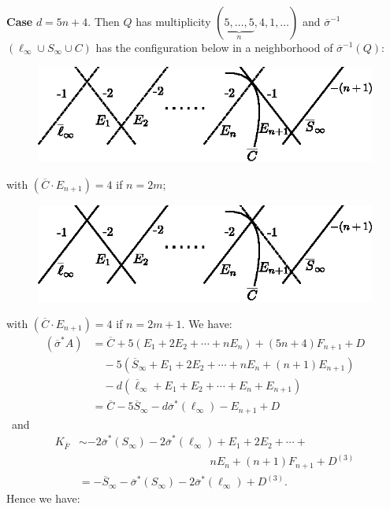\subsubsection{}\label{chap3:3.5.4}
{\bf Case} $d=5n+4$. Then $Q$ has multiplicity
$(\underbrace{5,\ldots,5}_{n},4,1,\ldots)$ and
$\overline{\sigma}^{-1}$ $(\ell_{\infty}\cup S_{\infty}\cup C)$ has the
configuration below in a neighborhood of $\overline{\sigma}^{-1}(Q)$:  
\begin{figure}[H]
\centering
\includegraphics{figures/miyansi_fig42.eps}
\end{figure}
\noindent
with $(\overline{C}\cdot E_{n+1})=4$ if $n=2m$;
\begin{figure}[H]
\centering
\includegraphics{figures/miyansi_fig43.eps}
\end{figure}
\noindent
with $(\overline{C}\cdot E_{n+1})=4$ if $n=2m+1$. We have:
\begin{align*}
(\overline{\sigma}^{\ast}A) &=
  \overline{C}+5(E_{1}+2E_{2}+\cdots+nE_{n})+(5n+4)F_{n+1}+D\\
&\quad
  -5(\overline{S}_{\infty}+E_{1}+2E_{2}+\cdots+nE_{n}+(n+1)E_{n+1})\\
&\quad -d(\overline{\ell}_{\infty}+E_{1}+E_{2}+\cdots+E_{n}+E_{n+1})\\
&=
  \overline{C}-5\overline{S}_{\infty}-d\overline{\sigma}^{\ast}(\ell_{\infty})-E_{n+1}+D 
\end{align*}\pageoriginale\ 
and
\begin{align*}
K_{\overline{F}} &\sim
-2\overline{\sigma}^{\ast} (S_{\infty})- 2\overline{\sigma}^{\ast}
(\ell_{\infty}) + E_{1}+2E_{2}+\cdots+\\
& \hspace{5cm}nE_{n} +(n+1) F_{n+1}+D^{(3)}\\ 
&= -\overline{S}_{\infty}-\overline{\sigma}^{\ast}(S_{\infty})-2\overline{\sigma}^{\ast}(\ell_{\infty})+D^{(3)}.
\end{align*}
Hence we have:


